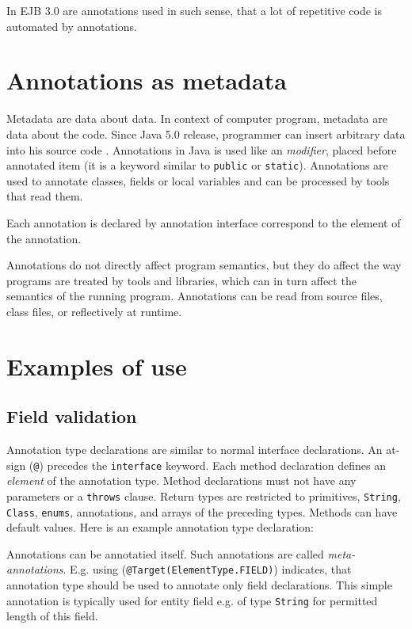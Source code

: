\documentclass[11pt,twoside,a4paper]{book}
\begin{document}
In EJB 3.0 are annotations used in such sense, that a lot of repetitive code is
automated by annotations.

\section{Annotations as metadata}
Metadata are data about data. In context of computer program, metadata are data
about the code. Since Java 5.0 release, programmer can insert arbitrary data
into his source code \cite{java:annotations}. Annotations in Java is used like
an \textit{modifier}, placed before annotated item (it is a keyword similar to \verb|public| or
\verb|static|). Annotations are used to annotate classes, fields or local
variables and can be processed by tools that read them.

Each annotation is declared by annotation interface correspond to the element of
the annotation.

Annotations do not directly affect program semantics, but they do affect the way
programs are treated by tools and libraries, which can in turn affect the
semantics of the running program. Annotations can be read from source files,
class files, or reflectively at runtime.

\section{Examples of use}

\subsection{Field validation}

Annotation type declarations are similar to normal interface declarations. An
at-sign (\verb|@|) precedes the \verb|interface| keyword. Each method
declaration defines an \textit{element} of the annotation type. Method
declarations must not have any parameters or a \verb|throws| clause. Return
types are restricted to primitives, \verb|String|, \verb|Class|, \verb|enums|,
annotations, and arrays of the preceding types. Methods can have default values.
Here is an example annotation type declaration:



Annotations can be annotatied itself. Such annotations are called
\textit{meta-annotations}. E.g. using
(\verb|@Target(ElementType.FIELD)|) indicates, that annotation type should
be used to annotate only field declarations.
This simple annotation is typically used for entity field e.g. of type
\verb|String| for permitted length of this field.
\end{document}
